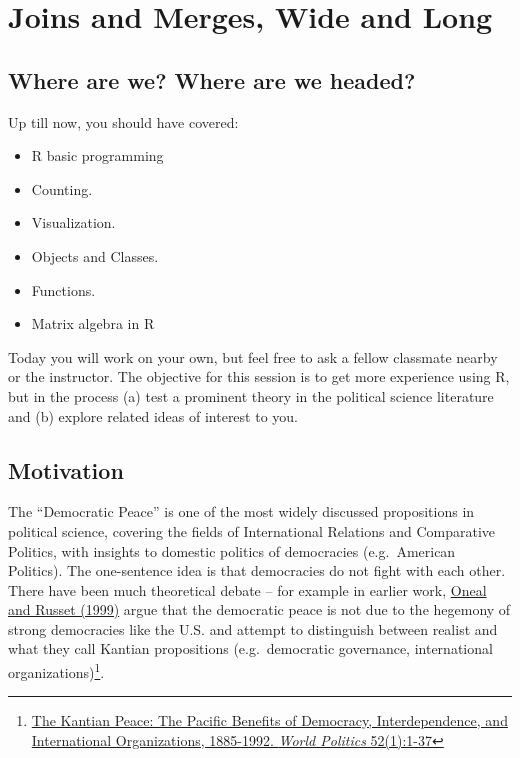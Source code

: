 \documentclass[]{book}
\providecommand{\tightlist}{%
  \setlength{\itemsep}{0pt}\setlength{\parskip}{0pt}}
\let\rmarkdownfootnote\footnote%
\def\footnote{\protect\rmarkdownfootnote}
\theoremstyle{definition}
\theoremstyle{definition}
\theoremstyle{definition}
\theoremstyle{remark}
\begin{document}
\chapter{Joins and Merges, Wide and
Long}\label{joins-and-merges-wide-and-long}

\section{Where are we? Where are we
headed?}\label{where-are-we-where-are-we-headed-2}

Up till now, you should have covered:

\begin{itemize}
\tightlist
\item
  R basic programming
\item
  Counting.
\item
  Visualization.
\item
  Objects and Classes.
\item
  Functions.
\item
  Matrix algebra in R
\end{itemize}

Today you will work on your own, but feel free to ask a fellow classmate
nearby or the instructor. The objective for this session is to get more
experience using R, but in the process (a) test a prominent theory in
the political science literature and (b) explore related ideas of
interest to you.

\section{Motivation}\label{motivation-2}

The ``Democratic Peace'' is one of the most widely discussed
propositions in political science, covering the fields of International
Relations and Comparative Politics, with insights to domestic politics
of democracies (e.g.~American Politics). The one-sentence idea is that
democracies do not fight with each other. There have been much
theoretical debate -- for example in earlier work,
\href{https://blackboard.angelo.edu/bbcswebdav/institution/LFA/CSS/Course\%20Material/SEC6302/Readings/Lesson_3/Oneal-Russett.pdf}{Oneal
and Russet (1999)} argue that the democratic peace is not due to the
hegemony of strong democracies like the U.S. and attempt to distinguish
between realist and what they call Kantian propositions (e.g.~democratic
governance, international organizations)\footnote{\href{https://blackboard.angelo.edu/bbcswebdav/institution/LFA/CSS/Course\%20Material/SEC6302/Readings/Lesson_3/Oneal-Russett.pdf}{The
  Kantian Peace: The Pacific Benefits of Democracy, Interdependence, and
  International Organizations, 1885-1992. \emph{World Politics}
  52(1):1-37}}.
\end{document}
